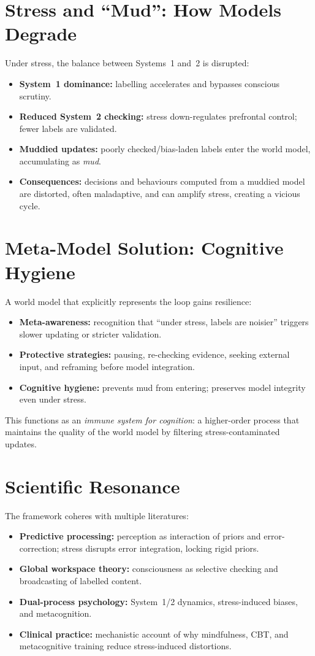 \documentclass[11pt,a4paper]{article}
\begin{document}
\section{Stress and ``Mud'': How Models Degrade}
Under stress, the balance between Systems~1 and~2 is disrupted:
\begin{itemize}
  \item \textbf{System~1 dominance:} labelling accelerates and bypasses conscious scrutiny.
  \item \textbf{Reduced System~2 checking:} stress down-regulates prefrontal control; fewer labels are validated.
  \item \textbf{Muddied updates:} poorly checked/bias-laden labels enter the world model, accumulating as \emph{mud}.
  \item \textbf{Consequences:} decisions and behaviours computed from a muddied model are distorted, often maladaptive, and can amplify stress, creating a vicious cycle.
\end{itemize}

\section{Meta-Model Solution: Cognitive Hygiene}
A world model that explicitly represents the loop gains resilience:
\begin{itemize}
  \item \textbf{Meta-awareness:} recognition that ``under stress, labels are noisier'' triggers slower updating or stricter validation.
  \item \textbf{Protective strategies:} pausing, re-checking evidence, seeking external input, and reframing before model integration.
  \item \textbf{Cognitive hygiene:} prevents mud from entering; preserves model integrity even under stress.
\end{itemize}
This functions as an \emph{immune system for cognition}: a higher-order process that maintains the quality of the world model by filtering stress-contaminated updates.

\section{Scientific Resonance}
The framework coheres with multiple literatures:
\begin{itemize}
  \item \textbf{Predictive processing:} perception as interaction of priors and error-correction; stress disrupts error integration, locking rigid priors.
  \item \textbf{Global workspace theory:} consciousness as selective checking and broadcasting of labelled content.
  \item \textbf{Dual-process psychology:} System~1/2 dynamics, stress-induced biases, and metacognition.
  \item \textbf{Clinical practice:} mechanistic account of why mindfulness, CBT, and metacognitive training reduce stress-induced distortions.
\end{itemize}
\end{document}

